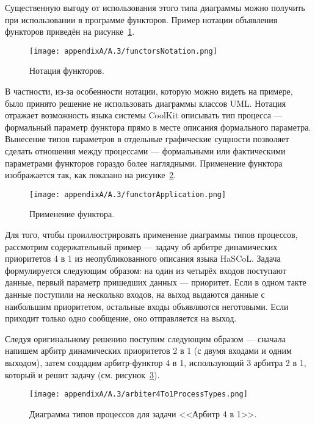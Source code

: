 Существенную выгоду от использования этого типа диаграммы можно получить при использовании 
в программе функторов. Пример нотации объявления функторов приведён на рисунке~\ref{image:functorsNotation}. 

\begin{figure} [ht]
	\begin{center}
		\texttt{[image: appendixA/A.3/functorsNotation.png]}
		\caption{Нотация функторов.}
		\label{image:functorsNotation}
	\end{center}
\end{figure}

В частности, из-за особенности нотации, которую можно видеть на примере, было принято 
решение не использовать диаграммы классов UML. Нотация отражает возможность языка 
системы CoolKit описывать тип процесса --- формальный параметр функтора прямо в месте 
описания формального параметра. Вынесение типов параметров в отдельные графические 
сущности позволяет сделать отношения между процессами --- формальными или фактическими 
параметрами функторов гораздо более наглядными. Применение функтора изображается так, 
как показано на рисунке~\ref{image:functorApplication}.

\begin{figure} [ht]
	\begin{center}
		\texttt{[image: appendixA/A.3/functorApplication.png]}
		\caption{Применение функтора.}
		\label{image:functorApplication}
	\end{center}
\end{figure}

Для того, чтобы проиллюстрировать применение диаграммы типов процессов, рассмотрим 
содержательный пример --- задачу об арбитре динамических приоритетов 4 в 1 из неопубликованного
описания языка HaSCoL. Задача формулируется следующим образом: на один из четырёх входов поступают данные, 
первый параметр пришедших данных --- приоритет. Если в одном такте данные поступили 
на несколько входов, на выход выдаются данные с наибольшим приоритетом, остальные 
входы объявляются неготовыми. Если приходит только одно сообщение, оно отправляется 
на выход.

Следуя оригинальному решению поступим следующим образом --- сначала напишем арбитр 
динамических приоритетов 2 в 1 (с двумя входами и одним выходом), затем создадим арбитр-функтор 
4 в 1, использующий 3 арбитра 2 в 1, который и решит задачу (см. рисунок~\ref{image:arbiter4To1ProcessTypes}). 

\begin{figure} [ht]
	\begin{center}
		\texttt{[image: appendixA/A.3/arbiter4To1ProcessTypes.png]}
		\caption{Диаграмма типов процессов для задачи <<Арбитр 4 в 1>>.}
		\label{image:arbiter4To1ProcessTypes}
	\end{center}
\end{figure}

